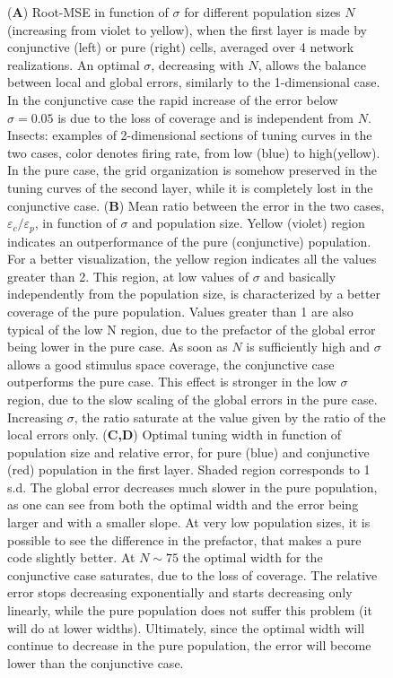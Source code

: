 \documentclass[a4paper]{article}
\begin{document}
\begin{figure} [t!]
    \captionsetup{labelformat=adja-page}
    \ContinuedFloat
    \caption[Figure]{
(\textbf{A}) Root-MSE in function of $\sigma$  for different population sizes $N$ (increasing from violet to yellow), when the first layer is made by conjunctive (left) or pure (right) cells, averaged over 4 network realizations. An optimal $\sigma$, decreasing with $N$, allows the balance between local and global errors, similarly to the 1-dimensional case. In the conjunctive case the rapid increase of the error below $\sigma=0.05$ is due to the loss of coverage and is independent from $N$. Insects: examples of  2-dimensional sections of tuning curves in the two cases, color denotes firing rate, from low (blue) to high(yellow). In the pure case, the grid organization is somehow preserved in the tuning curves of the second layer, while it is completely lost in the conjunctive case. (\textbf{B}) Mean ratio between the error in the two cases, $\varepsilon_c/\varepsilon_p$, in function of $\sigma$ and population size. Yellow (violet) region indicates an outperformance of the pure (conjunctive) population. For a better visualization, the yellow region indicates all the values greater than 2. This region, at low values of $\sigma$ and basically independently from the population size, is characterized by a better coverage of the pure population. Values greater than 1 are also typical of the low N region, due to the prefactor of the global error being lower in the pure case. As soon as $N$ is sufficiently high and $\sigma$ allows a good stimulus space coverage, the conjunctive case outperforms  the pure case. This effect is stronger in the low $\sigma$ region, due to the slow scaling of the global errors in the pure case. Increasing $\sigma$, the ratio saturate at the value given by the ratio of the local errors only.
(\textbf{C,D}) Optimal tuning width in function of population size and relative error, for pure (blue) and conjunctive (red) population in the first layer. Shaded region corresponds to 1 s.d. The global error decreases much slower in the pure population, as one can see from both the optimal width and the error being larger and with a smaller slope.  At very low population sizes, it is possible to see the difference in the prefactor, that makes a pure code slightly better. At $N\sim 75$ the optimal width for the conjunctive case saturates, due to the loss of coverage. The relative error stops decreasing exponentially and starts decreasing only linearly, while the pure population does not suffer this problem (it will do at lower widths). Ultimately, since the optimal width will continue to decrease in the pure population, the error will become lower than the conjunctive case.}
    \label{Fig:5}
\end{figure}
\end{document}
